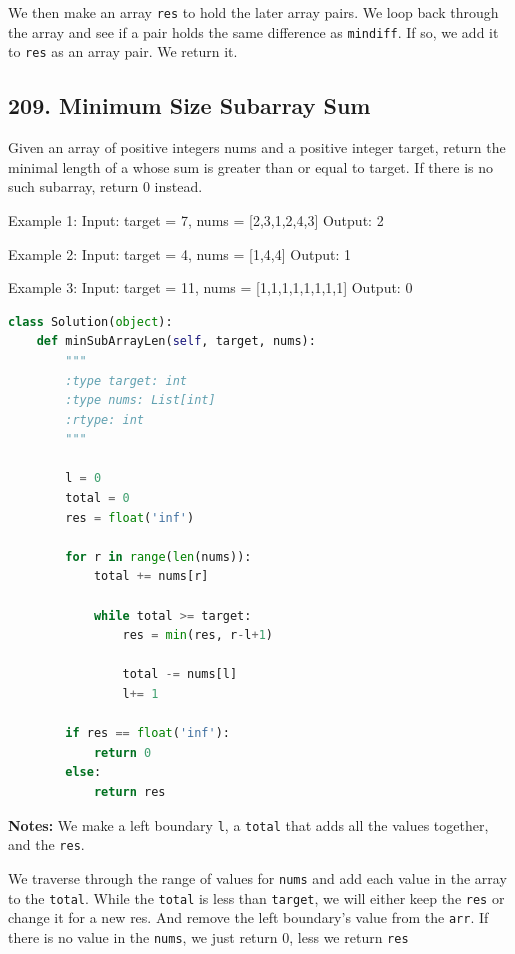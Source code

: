 \documentclass[11pt]{article}
\begin{document}
\noindent We then make an array \texttt{res} to hold the later array pairs. We loop back through the array and see if a pair holds the same difference as \texttt{mindiff}. If so, we add it to \texttt{res} as an array pair. We return it.







\subsection*{209. Minimum Size Subarray Sum}
Given an array of positive integers nums and a positive integer target, return the minimal length of a whose sum is greater than or equal to target. If there is no such subarray, return 0 instead.

Example 1:
Input: target = 7, nums = [2,3,1,2,4,3]
Output: 2

Example 2:
Input: target = 4, nums = [1,4,4]
Output: 1

Example 3:
Input: target = 11, nums = [1,1,1,1,1,1,1,1]
Output: 0

\begin{lstlisting}[language=python, mathescape=true]
class Solution(object):
    def minSubArrayLen(self, target, nums):
        """
        :type target: int
        :type nums: List[int]
        :rtype: int
        """

        l = 0
        total = 0
        res = float('inf')

        for r in range(len(nums)):
            total += nums[r]

            while total >= target:
                res = min(res, r-l+1)

                total -= nums[l]
                l+= 1

        if res == float('inf'):
            return 0
        else:
            return res
\end{lstlisting}

\noindent \textbf{Notes:} We make a left boundary \texttt{l}, a \texttt{total} that adds all the values together, and the \texttt{res}.

\noindent We traverse through the range of values for \texttt{nums} and add each value in the array to the \texttt{total}. While the \texttt{total} is less than \texttt{target}, we will either keep the \texttt{res} or change it for a new res. And remove the left boundary's value from the \texttt{arr}. If there is no value in the \texttt{nums}, we just return 0, less we return \texttt{res}
\end{document}

